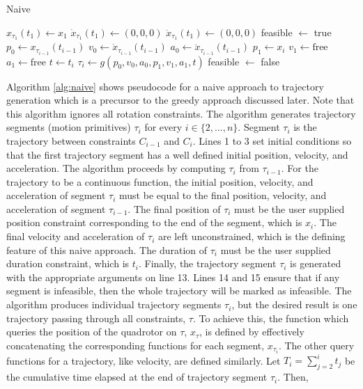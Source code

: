 \documentclass[pageno]{jpaper}
\begin{document}
\begin{algorithm}
\caption{Naive}\label{alg:naive}
\begin{algorithmic}[1]
\State $x_{\tau_1}(t_1) \gets x_1$
\State $\dot x_{\tau_1}(t_1) \gets (0, 0, 0)$
\State $\ddot x_{\tau_1}(t_1) \gets (0, 0, 0)$
\State feasible $\gets$ true
  \State $p_0 \gets x_{\tau_{i-1}}(t_{i-1})$
  \State $v_0 \gets \dot x_{\tau_{i-1}}(t_{i-1})$
  \State $a_0 \gets \ddot x_{\tau_{i-1}}(t_{i-1})$
  \State $p_1 \gets x_i$
  \State $v_1 \gets \text{free}$
  \State $a_1 \gets \text{free}$
  \State $t \gets t_i$
  \State $\tau_i \gets g(p_0, v_0, a_0, p_1, v_1, a_1, t)$
    \State feasible $\gets$ false
  \EndIf
\EndFor
\end{algorithmic}
\end{algorithm}

Algorithm \ref{alg:naive} shows pseudocode for a naive approach to trajectory generation which is a precursor to the greedy approach discussed later. Note that this algorithm ignores all rotation constraints. The algorithm generates trajectory segments (motion primitives) $\tau_i$ for every $i \in \{2, \dots, n\}$. Segment $\tau_i$ is the trajectory between constraints $C_{i-1}$ and $C_i$. Lines 1 to 3 set initial conditions so that the first trajectory segment has a well defined initial position, velocity, and acceleration. The algorithm proceeds by computing $\tau_i$ from $\tau_{i-1}$. For the trajectory to be a continuous function, the initial position, velocity, and acceleration of segment $\tau_i$ must be equal to the final position, velocity, and acceleration of segment $\tau_{i-1}$. The final position of $\tau_i$ must be the user supplied position constraint corresponding to the end of the segment, which is $x_i$. The final velocity and acceleration of $\tau_i$ are left unconstrained, which is the defining feature of this naive approach. The duration of $\tau_i$ must be the user supplied duration constraint, which is $t_i$. Finally, the trajectory segment $\tau_i$ is generated with the appropriate arguments on line 13. Lines 14 and 15 ensure that if any segment is infeasible, then the whole trajectory will be marked as infeasible. The algorithm produces individual trajectory segments $\tau_i$, but the desired result is one trajectory passing through all constraints, $\tau$. To achieve this, the function which queries the position of the quadrotor on $\tau$, $x_{\tau}$, is defined by effectively concatenating the corresponding functions for each segment, $x_{\tau_i}$. The other query functions for a trajectory, like velocity, are defined similarly. Let $T_i = \sum_{j=2}^i t_j$ be the cumulative time elapsed at the end of trajectory segment $\tau_i$. Then,
\end{document}
